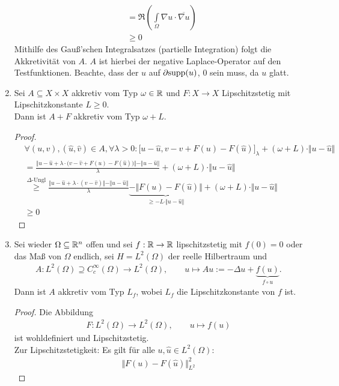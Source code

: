 \begin{beispiel}
\begin{enumerate}[label=(\alph*)]
\begin{align*}
&=\Re\left(\int\limits_{\Omega} \nabla u\cdot\overline{\nabla u}\right)\\
&\geq0
\end{align*}
Mithilfe des Gauß'schen Integralsatzes (partielle Integration) folgt die Akkretivität von $A$. $A$ ist hierbei der negative Laplace-Operator auf den Testfunktionen.
Beachte, dass der $u$ auf $\partial \text{supp}(u)$, $0$ sein muss, da $u$ glatt.
\item Sei $A\subseteq X\times X$ akkretiv vom Typ $\omega\in\mathbb{R}$ und $F:X\to X$ Lipschitzstetig mit Lipschitzkonstante $L\geq0$.\\
Dann ist $A+F$ akkretiv vom Typ $\omega+L$.
\begin{proof}
\begin{align*}
&\forall (u,v),(\hat{u},\hat{v})\in A,\forall\lambda>0:
\big[u-\hat{u},v-\hat{v}+F(u)-F(\hat{u})\big]_\lambda
+(\omega+L)\cdot\Vert u-\hat{u}\Vert\\
&=\frac{\Big\Vert u-\hat{u}+\lambda\cdot\big(v-\hat{v}+F(u)-F(\hat{u})\big)\Big\Vert-\Vert u-\hat{u}\Vert}{\lambda}
+(\omega+L)\cdot\Vert u-\hat{u}\Vert\\
&\stackrel{\Delta\text{-Ungl}}{\geq}
\frac{\big\Vert u-\hat{u}+\lambda\cdot(v-\hat{v})\big\Vert-\Vert u-\hat{u}\Vert}{\lambda}\underbrace{-\big\Vert F(u)-F(\hat{u})\big\Vert}_{\geq -L\cdot\Vert u-\hat{u}\Vert}
+(\omega+L)\cdot\Vert u-\hat{u}\Vert\\
&\geq0
\end{align*}
\end{proof}
\item Sei wieder $\Omega\subseteq\mathbb{R}^n$ offen und sei $f:\mathbb{R}\to\mathbb{R}$ lipschitzstetig mit $f(0)=0$ oder das Maß von $\Omega$ endlich, sei $H=L^2(\Omega)$ der reelle Hilbertraum und
\begin{align*}
A:L^2(\Omega)\supseteq C_c^\infty(\Omega)\to L^2(\Omega),\qquad
u\mapsto Au:=-\Delta u+\underbrace{f(u)}_{f\circ u}.
\end{align*}
Dann ist $A$ akkretiv vom Typ $L_f$, wobei $L_f$ die Lipschitzkonstante von $f$ ist.
\begin{proof}
Die Abbildung
\begin{align*}
F: L^2(\Omega)\to L^2(\Omega),\qquad u\mapsto f(u)
\end{align*}
ist wohldefiniert und Lipschitzstetig.\\
Zur Lipschitzstetigkeit: Es gilt für alle $u,\hat{u}\in L^2(\Omega)$:
\begin{align*}
\big\Vert F(u)-F(\hat{u})\big\Vert^2_{L^2}

\end{align*}
\end{proof}
\end{enumerate}
\end{beispiel}
